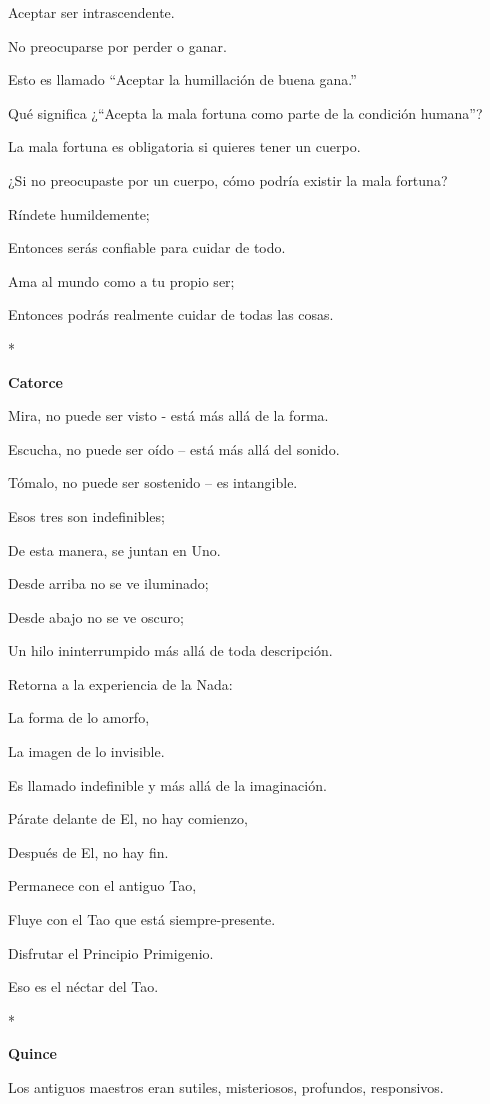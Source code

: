 Aceptar ser intrascendente.

No preocuparse por perder o ganar.

Esto es llamado ``Aceptar la humillación de buena gana.''

Qué significa ¿``Acepta la mala fortuna como parte de la condición
humana''?

La mala fortuna es obligatoria si quieres tener un cuerpo.

¿Si no preocupaste por un cuerpo, cómo podría existir la mala fortuna?

Ríndete humildemente;

Entonces serás confiable para cuidar de todo.

Ama al mundo como a tu propio ser;

Entonces podrás realmente cuidar de todas las cosas.

*

\textbf{Catorce}

Mira, no puede ser visto - está más allá de la forma.

Escucha, no puede ser oído -- está más allá del sonido.

Tómalo, no puede ser sostenido -- es intangible.

Esos tres son indefinibles;

De esta manera, se juntan en Uno.

Desde arriba no se ve iluminado;

Desde abajo no se ve oscuro;

Un hilo ininterrumpido más allá de toda descripción.

Retorna a la experiencia de la Nada:

La forma de lo amorfo,

La imagen de lo invisible.

Es llamado indefinible y más allá de la imaginación.

Párate delante de El, no hay comienzo,

Después de El, no hay fin.

Permanece con el antiguo Tao,

Fluye con el Tao que está siempre-presente.

Disfrutar el Principio Primigenio.

Eso es el néctar del Tao.

*

\textbf{Quince}

Los antiguos maestros eran sutiles, misteriosos, profundos, responsivos.

